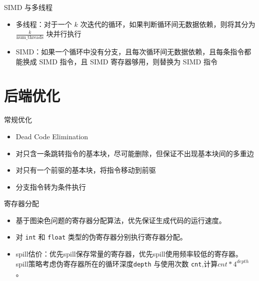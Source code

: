 \documentclass[aspectratio=169,UTF-8]{ctexbeamer}
\begin{document}
		\begin{frame}{SIMD 与多线程}
			\begin{itemize}
				\item 多线程：对于一个 $k$ 次迭代的循环，如果判断循环间无数据依赖，则将其分为 $\frac{k}{\mathrm{num\_threads}}$ 块并行执行
				\item SIMD：如果一个循环中没有分支，且每次循环间无数据依赖，且每条指令都能换成 SIMD 指令，且 SIMD 寄存器够用，则替换为 SIMD 指令
			\end{itemize}

		\end{frame}
	
	\section{后端优化}
	
		\begin{frame}{常规优化}
			\begin{itemize}
				\item Dead Code Elimination
				\item 对只含一条跳转指令的基本块，尽可能删除，但保证不出现基本块间的多重边
				\item 对只有一个前驱的基本块，将指令移动到前驱
				\item 分支指令转为条件执行
			\end{itemize}
		\end{frame}
		
		\begin{frame}{寄存器分配}
			\begin{itemize}
				\item 基于图染色问题的寄存器分配算法，优先保证生成代码的运行速度。
				\item 对 \lstinline{int} 和 \lstinline{float} 类型的伪寄存器分别执行寄存器分配。
				\item spill估价：优先spill保存常量的寄存器，优先spill使用频率较低的寄存器。
				spill策略考虑伪寄存器所在的循环深度\lstinline{depth} 与使用次数 \lstinline{cnt},计算$cnt * 4^{depth}$。
				\end{itemize}
		\end{frame}
	
\end{document}
